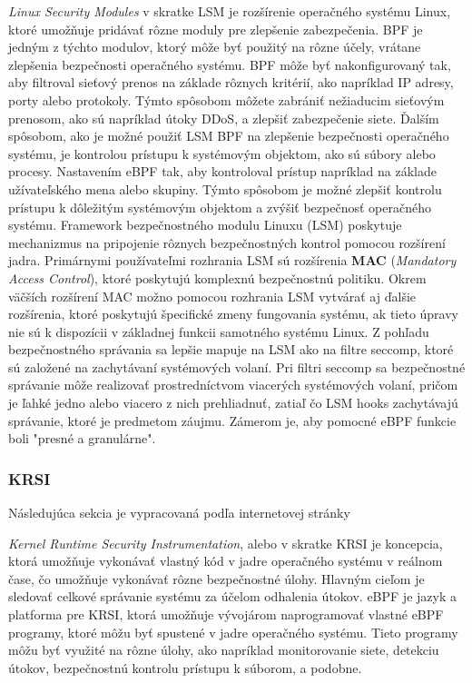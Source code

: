 \emph{Linux Security Modules} v skratke LSM je rozšírenie operačného systému Linux, ktoré umožňuje pridávať rôzne moduly pre zlepšenie zabezpečenia. 
BPF je jedným z týchto modulov, ktorý môže byť použitý na rôzne účely, vrátane zlepšenia bezpečnosti operačného systému. BPF môže byť nakonfigurovaný tak, 
aby filtroval sieťový prenos na základe rôznych kritérií, ako napríklad IP adresy, porty alebo protokoly. Týmto spôsobom môžete zabrániť 
nežiaducim sieťovým prenosom, ako sú napríklad útoky DDoS, a zlepšiť zabezpečenie siete. Ďalším spôsobom, ako je možné použiť LSM BPF 
na zlepšenie bezpečnosti operačného systému, je kontrolou prístupu k systémovým objektom, ako sú súbory alebo procesy. Nastavením eBPF tak, 
aby kontroloval prístup napríklad na základe užívateľského mena alebo skupiny. Týmto spôsobom je možné 
zlepšiť kontrolu prístupu k dôležitým systémovým objektom a zvýšiť bezpečnosť operačného systému. Framework bezpečnostného modulu Linuxu (LSM) 
poskytuje mechanizmus na pripojenie rôznych bezpečnostných kontrol pomocou rozšírení jadra. Primárnymi používateľmi rozhrania LSM 
sú rozšírenia \textbf{MAC} (\emph{Mandatory Access Control}), ktoré poskytujú komplexnú bezpečnostnú politiku. Okrem väčších rozšírení MAC možno pomocou 
rozhrania LSM vytvárať aj ďalšie rozšírenia, ktoré poskytujú špecifické zmeny fungovania systému, ak tieto úpravy nie sú k dispozícii 
v základnej funkcii samotného systému Linux. Z pohľadu bezpečnostného správania sa lepšie mapuje na LSM ako na filtre seccomp, 
ktoré sú založené na zachytávaní systémových volaní. Pri filtri seccomp sa bezpečnostné správanie môže realizovať prostredníctvom viacerých systémových volaní, 
pričom je ľahké jedno alebo viacero z nich prehliadnuť, zatiaľ čo LSM hooks zachytávajú správanie, ktoré je predmetom záujmu. 
Zámerom je, aby pomocné eBPF funkcie boli "presné a granulárne".

\subsubsection{KRSI}
Následujúca sekcia je vypracovaná podľa internetovej stránky~\cite{krsi,krsi-sm}

\emph{Kernel Runtime Security Instrumentation}, alebo v skratke KRSI je koncepcia, ktorá umožňuje vykonávať vlastný kód v jadre operačného systému v reálnom čase, 
čo umožňuje vykonávať rôzne bezpečnostné úlohy. Hlavným cieľom je sledovať celkové správanie systému za účelom odhalenia útokov.  
eBPF je jazyk a platforma pre KRSI, ktorá umožňuje vývojárom naprogramovať vlastné eBPF programy, ktoré môžu byť spustené v jadre operačného systému. 
Tieto programy môžu byť využité na rôzne úlohy, ako napríklad monitorovanie siete, detekciu útokov, bezpečnostnú kontrolu prístupu k súborom, a podobne. 

